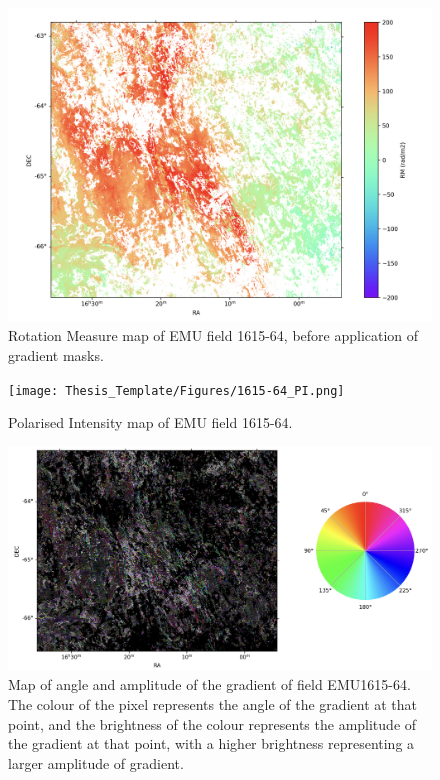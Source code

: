 \begin{figure}
    \centering
    \includegraphics[width=1\linewidth]{Thesis_Template/Figures/1615-64_RM.png}
    \caption[Rotation Measure map of EMU field 1615-64.]{Rotation Measure map of EMU field 1615-64, before application of gradient masks.}
    \label{fig:1615-64 rm}
\end{figure}

\begin{figure}
    \centering
    \texttt{[image: Thesis\_Template/Figures/1615-64\_PI.png]}
    \caption{Polarised Intensity map of EMU field 1615-64.}
    \label{fig:1615-64 pi}
\end{figure}

\begin{figure}
    \centering
    \includegraphics[width=\linewidth]{Thesis_Template/Figures/Hue_3.png}
    \caption[Gradient map of field EMU1615-64]{Map of angle and amplitude of the gradient of field EMU1615-64. The colour of the pixel represents the angle of the gradient at that point, and the brightness of the colour represents the amplitude of the gradient at that point, with a higher brightness representing a larger amplitude of gradient. }
    \label{fig:hue}
\end{figure}

